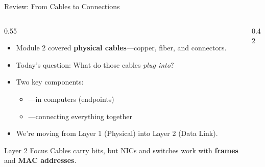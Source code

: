\documentclass[aspectratio=169]{beamer}  %
\begin{document}
\begin{frame}{Review: From Cables to Connections}
    \begin{columns}[T]
        \begin{column}{0.55\textwidth}
            \begin{itemize}
                \item Module 2 covered \textbf{physical cables}---copper, fiber, and connectors.
                \item Today's question: What do those cables \textit{plug into}?
                \item Two key components:
                    \begin{itemize}
                        \item {}---in computers (endpoints)
                        \item {}---connecting everything together
                    \end{itemize}
                \item We're moving from Layer 1 (Physical) into Layer 2 (Data Link).
            \end{itemize}
            
            \vspace{0.3em}
            \begin{alertblock}{Layer 2 Focus}
                Cables carry bits, but NICs and switches work with \textbf{frames} and \textbf{MAC addresses}.
            \end{alertblock}
        \end{column}
        \begin{column}{0.42\textwidth}
            \begin{center}
\end{center}
\end{column}
\end{columns}
\end{frame}
\end{document}
